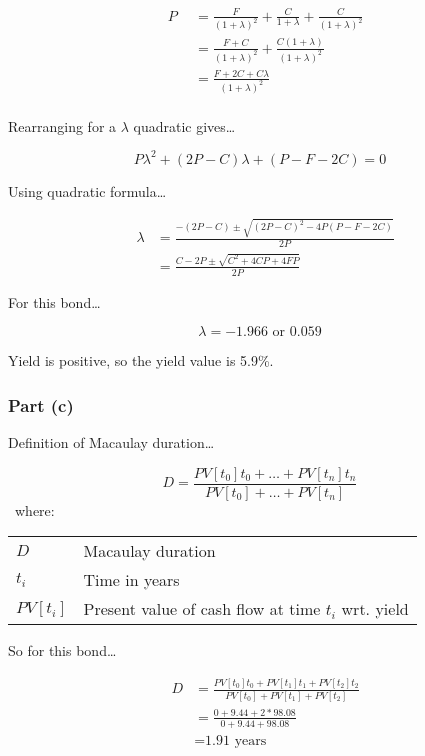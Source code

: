 \documentclass[11pt]{article}
\makeatletter
\newenvironment{conditions}
  {\par\vspace{\abovedisplayskip}\noindent\begin{tabular}{>{$}l<{$} @{${}={}$} l}}
  {\end{tabular}\par\vspace{\belowdisplayskip}}
\makeatother
\begin{document}
\begin{eqnarray}
  & P \
\
  &= \frac{F}{\left(1 + \lambda\right)^{2}} + \frac{C}{1 + \lambda} + \frac{C}{\left(1 + \lambda\right)^{2}} \\
  &&= \frac{F + C}{\left(1 + \lambda\right)^{2}} + \frac{C\left(1 + \lambda\right)}{\left(1 + \lambda\right)^{2}} \\
  &&= \frac{F + 2C + C\lambda}{\left(1 + \lambda\right)^{2}} \\
\end{eqnarray}

Rearranging for a $\lambda$ quadratic gives\dots

\[P\lambda^{2} + \left(2P - C\right)\lambda + \left(P - F - 2C\right) = 0\]

Using quadratic formula\dots

\begin{eqnarray}
  & \lambda &= \frac{ -\left(2P - C\right) \pm \sqrt{\left(2P - C\right)^{2} - 4P\left(P - F - 2C\right)} }{2P} \\
  &&= \frac{ C - 2P \pm \sqrt{C^{2} + 4CP + 4FP} }{2P}
\end{eqnarray}

For this bond\dots

\[ \lambda = -1.966 \text{~or~} 0.059 \]

Yield is positive, so the yield value is 5.9\%.

\subsubsection*{Part (c)}

Definition of Macaulay duration\dots

\[ D = \frac{PV[t_{0}]t_{0} + \dots + PV[t_{n}]t_{n}}{PV[t_{0}] + \dots + PV[t_{n}]} \]
\
where:

\begin{conditions}
  D               & Macaulay duration \\
  t_{i}           & Time in years \\
  PV[t_{i}]       & Present value of cash flow at time $t_{i}$ wrt. yield
\end{conditions}

So for this bond\dots

\setcounter{equation}{0}
\begin{eqnarray}
  & D &= \frac{PV[t_{0}]t_{0} + PV[t_{1}]t_{1} + PV[t_{2}]t_{2}}{PV[t_{0}] + PV[t_{1}] + PV[t_{2}]} \\
  &&= \frac{0 + 9.44 + 2*98.08}{0 + 9.44 + 98.08} \\
  &&= \text{1.91 years}
\end{eqnarray}
\end{document}
